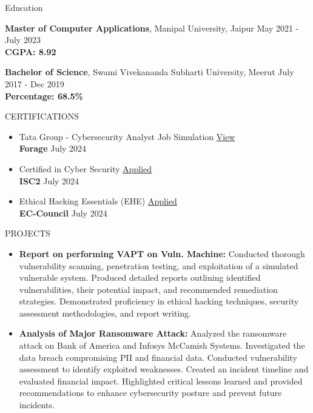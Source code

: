 \documentclass{resume} %
\begin{document}
\begin{rSection}{Education}

{\bf Master of Computer Applications}, Manipal University, Jaipur \hfill {May 2021 - July 2023}\\
\textbf{CGPA: 8.92}

{\bf Bachelor of Science}, Swami Vivekananda Subharti University, Meerut \hfill {July 2017 - Dec 2019}\\
\textbf{Percentage: 68.5\%}
\end{rSection}
\begin{rSection}{CERTIFICATIONS}
\begin{itemize}
    \item Tata Group - Cybersecurity Analyst Job Simulation \hfill \href{https://forage-uploads-prod.s3.amazonaws.com/completion-certificates/Tata/gmf3ypEXBj2wvfQWC_Tata%20Group_PynkGwAqrec2LCHy3_1719852016860_completion_certificate.pdf}{View}\\
    \textbf{Forage} \hfill July 2024
    \item Certified in Cyber Security \hfill \href{https://}{Applied}\\
    \textbf{ISC2} \hfill July 2024
    \item Ethical Hacking Essentials (EHE) \hfill \href{https://}{Applied}\\
    \textbf{EC-Council} \hfill July 2024
\end{itemize}
\end{rSection}
\begin{rSection}{PROJECTS}
\begin{itemize}
    \item \textbf{Report on performing VAPT on Vuln. Machine:} {Conducted thorough vulnerability scanning, penetration testing, and exploitation of a simulated vulnerable system. Produced detailed reports outlining identified vulnerabilities, their potential impact, and recommended remediation strategies. Demonstrated proficiency in ethical hacking techniques, security assessment methodologies, and report writing.}
    \item \textbf{Analysis of Major Ransomware Attack:} {Analyzed the ransomware attack on Bank of America and Infosys McCamish Systems. Investigated the data breach compromising PII and financial data. Conducted vulnerability assessment to identify exploited weaknesses. Created an incident timeline and evaluated financial impact. Highlighted critical lessons learned and provided recommendations to enhance cybersecurity posture and prevent future incidents.}
\end{itemize}
\end{rSection} 
\end{document}
